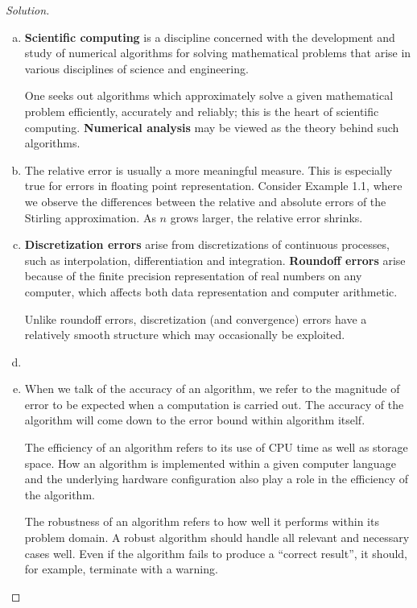 \documentclass[12pt,a4]{article}
\theoremstyle{definition}
\begin{document}
\begin{proof}[Solution]
	\begin{enumerate}[(a)]
		\item \textbf{Scientific computing} is a discipline concerned with the development and study of numerical algorithms for solving mathematical problems that arise in various disciplines of science and engineering. 
		
		One seeks out algorithms which approximately solve a given mathematical problem efficiently, accurately and reliably; this is the heart of scientific computing. \textbf{Numerical analysis} may be viewed as the theory behind such algorithms. 
		
		\item The relative error is usually a more meaningful measure. This is especially true for errors in floating point representation. Consider Example 1.1, where we observe the differences between the relative and absolute errors of the Stirling approximation. As $n$ grows larger, the relative error shrinks.
		
		\item \textbf{Discretization errors} arise from discretizations of continuous processes, such as interpolation, differentiation and integration. \textbf{Roundoff errors} arise because of the finite precision representation of real numbers on any computer, which affects both data representation and computer arithmetic. 
		
		Unlike roundoff errors, discretization (and convergence) errors have a relatively smooth structure which may occasionally be exploited. 
		
		\item 
		
		\item When we talk of the accuracy of an algorithm, we refer to the magnitude of error to be expected when a computation is carried out. The accuracy of the algorithm will come down to the error bound within algorithm itself. 
		
		The efficiency of an algorithm refers to its use of CPU time as well as storage space. How an algorithm is implemented within a given computer language and the underlying hardware configuration also play a role in the efficiency of the algorithm.
		
		The robustness of an algorithm refers to how well it performs within its problem domain. A robust algorithm should handle all relevant and necessary cases well. Even if the algorithm fails to produce a ``correct result'', it should, for example, terminate with a warning. 
		

\end{enumerate}
\end{proof}
\end{document}
